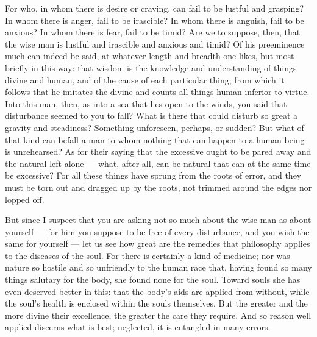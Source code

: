  For who, in whom there is desire or craving, can fail to be lustful and grasping? In whom there is anger, fail to be irascible? In whom there is anguish, fail to be anxious? In whom there is fear, fail to be timid? Are we to suppose, then, that the wise man is lustful and irascible and anxious and timid? Of his preeminence much can indeed be said, at whatever length and breadth one likes, but most briefly in this way: that wisdom is the knowledge and understanding of things divine and human, and of the cause of each particular thing; from which it follows that he imitates the divine and counts all things human inferior to virtue. Into this man, then, as into a sea that lies open to the winds, you said that disturbance seemed to you to fall? What is there that could disturb so great a gravity and steadiness? Something unforeseen, perhaps, or sudden? But what of that kind can befall a man to whom nothing that can happen to a human being is unrehearsed? As for their saying that the excessive ought to be pared away and the natural left alone — what, after all, can be natural that can at the same time be excessive? For all these things have sprung from the roots of error, and they must be torn out and dragged up by the roots, not trimmed around the edges nor lopped off.

 But since I suspect that you are asking not so much about the wise man as about yourself — for him you suppose to be free of every disturbance, and you wish the same for yourself — let us see how great are the remedies that philosophy applies to the diseases of the soul. For there is certainly a kind of medicine; nor was nature so hostile and so unfriendly to the human race that, having found so many things salutary for the body, she found none for the soul. Toward souls she has even deserved better in this: that the body's aids are applied from without, while the soul's health is enclosed within the souls themselves. But the greater and the more divine their excellence, the greater the care they require. And so reason well applied discerns what is best; neglected, it is entangled in many errors.


